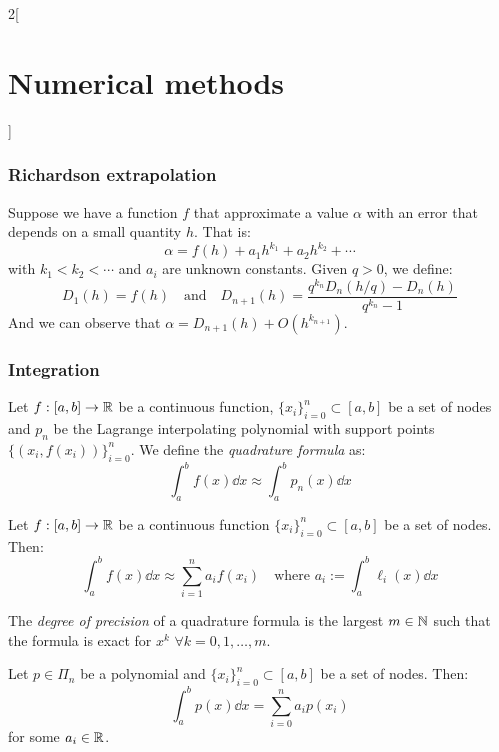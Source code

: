 \documentclass[../../../main.tex]{subfiles}
\begin{document}
\begin{multicols}{2}[\section{Numerical methods}]
  \subsubsection{Richardson extrapolation}
  \begin{theorem}
    Suppose we have a function $f$ that approximate a value $\alpha$ with an error that depends on a small quantity $h$. That is: $$\alpha=f(h)+a_1h^{k_1}+a_2h^{k_2}+\cdots$$ with $k_1<k_2<\cdots$ and $a_i$ are unknown constants. Given $q>0$, we define: $$D_1(h)=f(h)\quad\text{and}\quad D_{n+1}(h)=\frac{q^{k_n}D_n\left(h/q\right)-D_n(h)}{q^{k_n}-1}$$ And we can observe that $\alpha=D_{n+1}(h)+O(h^{k_{n+1}})$.
  \end{theorem}
  \subsubsection{Integration}
  \begin{definition}
    Let $f:[a,b]\rightarrow\mathbb{R}$ be a continuous function, $\{x_i\}_{i=0}^n\subset[a,b]$ be a set of nodes and $p_n$ be the Lagrange interpolating polynomial with support points $\{(x_i,f(x_i))\}_{i=0}^n$. We define the \textit{quadrature formula} as: $$\int_a^bf(x)\dd x\approx\int_a^bp_n(x)\dd x$$
  \end{definition}
  \begin{lemma}
    Let $f:[a,b]\rightarrow\mathbb{R}$ be a continuous function $\{x_i\}_{i=0}^n\subset[a,b]$ be a set of nodes. Then: $$\int_a^bf(x)\dd x\approx\sum_{i=1}^na_if(x_i)\quad\text{where }a_i:=\int_a^b\ell_i(x)\dd x$$
  \end{lemma}
  \begin{definition}
    The \textit{degree of precision} of a quadrature formula is the largest $m\in\mathbb{N}$ such that the formula is exact for $x^k$ $\forall k=0,1,\ldots,m$.
  \end{definition}
  \begin{lemma}
    Let $p\in\Pi_n$ be a polynomial and $\{x_i\}_{i=0}^n\subset[a,b]$ be a set of nodes. Then: $$\int_a^bp(x)\dd x=\sum_{i=0}^na_ip(x_i)$$ for some $a_i\in\mathbb{R}$.
  \end{lemma}

\end{multicols}
\end{document}
